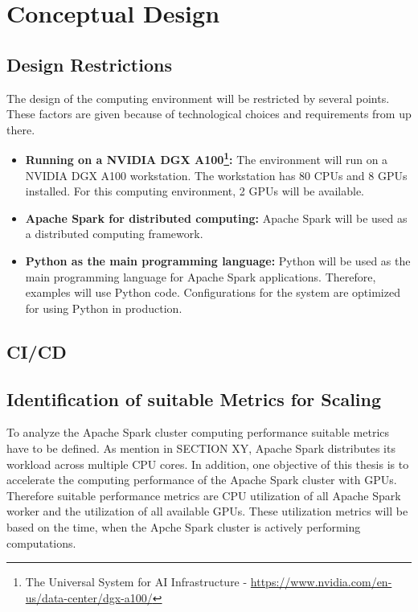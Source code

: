 \chapter{Conceptual Design}
\label{chap:05_design}
%


\section{Design Restrictions}
\label{sec:05_restrictions}
The design of the computing environment will be restricted by several points. These factors are given because of technological choices and requirements from up there.

\begin{itemize}
\item \textbf{Running on a NVIDIA DGX A100\footnote{The Universal System for AI Infrastructure - \url{https://www.nvidia.com/en-us/data-center/dgx-a100/}}:} The environment will run on a NVIDIA DGX A100 workstation. The workstation has 80 CPUs and 8 GPUs installed. For this computing environment, 2 GPUs will be available.

\item \textbf{Apache Spark for distributed computing:} Apache Spark will be used as a distributed computing framework.

\item \textbf{Python as the main programming language:} Python will be used as the main programming language for Apache Spark applications. Therefore, examples will use Python code. Configurations for the system are optimized for using Python in production.
\end{itemize}

\section{CI/CD}


\section{Identification of suitable Metrics for Scaling}
To analyze the Apache Spark cluster computing performance suitable metrics have to be defined.
As mention in SECTION XY, Apache Spark distributes its workload across multiple CPU cores. In addition, one objective of this thesis is to accelerate the computing performance of the Apache Spark cluster with GPUs.
Therefore suitable performance metrics are CPU utilization of all Apache Spark worker and the utilization of all available GPUs.
These utilization metrics will be based on the time, when the Apche Spark cluster is actively performing computations.


